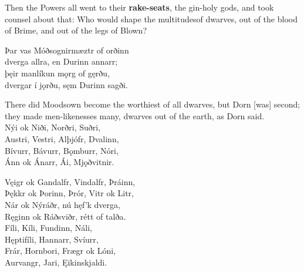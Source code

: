\bvb Then the Powers all went to their \textbf{rake-seats}, the gin-holy gods, and took counsel about that: Who would shape the multitudes\footnotemark[23] of dwarves, out of the blood of Brime, and out of the legs of Blown?

\bva Þar vas Móðsognir\footnotemark[25] \hld mæztr of orðinn \\%
dverga allra, \hld en Durinn annarr; \\%
þęir manlíkun \hld mǫrg of gęrðu, \\%
dvergar í jǫrðu, \hld sęm Durinn sagði.\\%

\bvb There did Moodsown become the worthiest of all dwarves, but Dorn [was] second; they made men-likenesses many, dwarves out of the earth, as Dorn said.\footnotemark[25]
\\%

\bva Nýi ok Niði, \hld Norðri, Suðri, \\%
Austri, Vestri, \hld Alþjófr, Dvalinn, \\%
Bívurr, Bávurr, \hld Bǫmburr, Nóri, \\%
Ánn ok Ánarr, \hld Ái, Mjǫðvitnir.\\%

\bva Vęigr ok Gandalfr, \hld Vindalfr, Þráinn, \\%
Þękkr ok Þorinn, \hld Þrór, Vitr ok Litr, \\%
Nár ok Nýráðr, \hld nú hęf'k dverga, \\%
Ręginn ok Ráðsviðr, \hld rétt of talða.\\%

\bva Fíli, Kíli, \hld Fundinn, Náli, \\%
Hęptifíli, \hld Hannarr, Svíurr, \\%
Frár, Hornbori, \hld Frægr ok Lóni, \\%
Aurvangr, Jari, \hld Ęikinskjaldi.\\%

